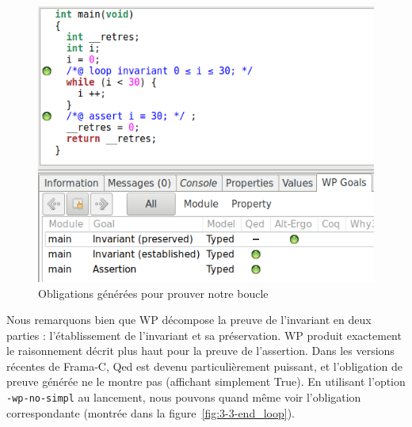\documentclass[12pt,francais,]{scrbook}
\begin{document}
\begin{figure}[htbp]
\centering
\includegraphics[scale=0.5]{3-3-1-i_30-1.png}
\caption{Obligations générées pour prouver notre boucle}
\label{fig:3-3-1-i_30-1}
\end{figure}

Nous remarquons bien que WP décompose la preuve de l'invariant en deux
parties : l'établissement de l'invariant et sa préservation. WP produit
exactement le raisonnement décrit plus haut pour la preuve de
l'assertion. Dans les versions récentes de Frama-C, Qed est devenu
particulièrement puissant, et l'obligation de preuve générée ne le
montre pas (affichant simplement \og{}True\fg{}). En utilisant l'option
\texttt{-wp-no-simpl} au lancement, nous pouvons quand même voir
l'obligation correspondante (montrée dans la figure~\ref{fig:3-3-end_loop}).
\end{document}
